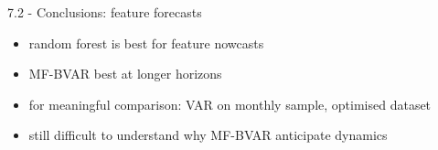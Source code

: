 \begin{frame}{7.2 - Conclusions: feature forecasts}
\begin{itemize}
	\item random forest is best for feature nowcasts
	\item MF-BVAR best at longer horizons
	\item for meaningful comparison: VAR on monthly sample, optimised dataset
	\item still difficult to understand why MF-BVAR anticipate dynamics
\end{itemize}	
\end{frame}

